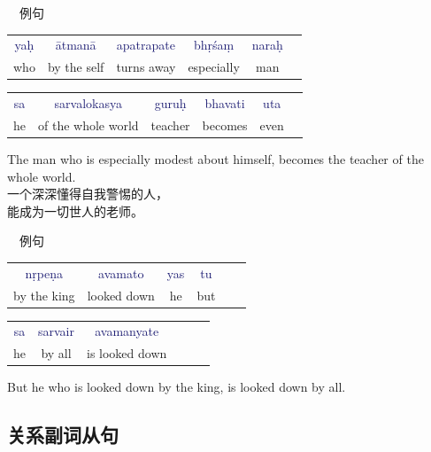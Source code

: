\documentclass[17pt]{beamer}
\newcommand{\fullsentence}[1]{\textcolor{MidnightBlue}{#1}}
\begin{document}
\begin{frame}{\insertsubsection ~~例句}
  \small
  \begin{tabular}{@{}cccccc@{}} %
    \fullsentence{yaḥ}  & \fullsentence{ātmanā} & \fullsentence{apatrapate} & \fullsentence{bhṛśaṃ} & \fullsentence{naraḥ}   \\
    who &  by the self & turns away & especially & man \\
  \end{tabular}
  \begin{tabular}{@{}cccccc@{}} %
    \fullsentence{sa}  & \fullsentence{sarvalokasya} & \fullsentence{guruḥ} & \fullsentence{bhavati} & \fullsentence{uta}   \\
    he &  of the whole world & teacher & becomes & even \\
  \end{tabular}

  \bigskip
  The man who is especially modest about himself, becomes the teacher of the whole world.\\
  一个深深懂得自我警惕的人，\\能成为一切世人的老师。
\end{frame}

\begin{frame}{\insertsubsection ~~例句}
  \small
  \begin{tabular}{@{}cccccc@{}} %
    \fullsentence{nṛpeṇa}  & \fullsentence{avamato} & \fullsentence{yas} & \fullsentence{tu}   \\
    by the king &  looked down & he & but \\
  \end{tabular}
  \begin{tabular}{@{}cccccc@{}} %
    \fullsentence{sa}  & \fullsentence{sarvair} & \fullsentence{avamanyate}  \\
    he & by all & is looked down  \\
  \end{tabular}
  
  \bigskip
  But he who is looked down by the king, is looked down by all.
\end{frame}

\subsection{关系副词从句}
\end{document}

